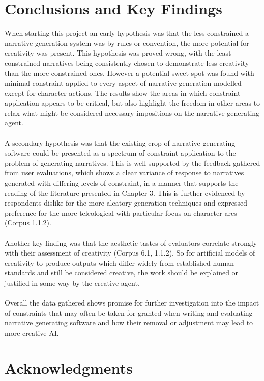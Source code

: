 \documentclass[letterpaper]{article}
\begin{document}
\section{Conclusions and Key Findings}
When starting this project an early hypothesis was that the less constrained a narrative generation system was by rules or convention, the more potential for creativity was present. This hypothesis was proved wrong, with the least constrained narratives being consistently chosen to demonstrate less creativity than the more constrained ones. However a potential sweet spot was found with minimal constraint applied to every aspect of narrative generation modelled except for character actions. The results show the areas in which constraint application appears to be critical, but also highlight the freedom in other areas to relax what might be considered necessary impositions on the narrative generating agent.\\
\\A secondary hypothesis was that the existing crop of narrative generating software could be presented as a spectrum of constraint application to the problem of generating narratives. This is well supported by the feedback gathered from user evaluations, which shows a clear variance of response to narratives generated with differing levels of constraint, in a manner that supports the reading of the literature presented in Chapter 3. This is further evidenced by respondents dislike for the more aleatory generation techniques and expressed preference for the more teleological with particular focus on character arcs (Corpus 1.1.2).\\
\\Another key finding was that the aesthetic tastes of evaluators correlate strongly with their assessment of creativity (Corpus 6.1, 1.1.2). So for artificial models of creativity to produce outputs which differ widely from established human standards and still be considered creative, the work should be explained or justified in some way by the creative agent.\\
\\Overall the data gathered shows promise for further investigation into the impact of constraints that may often be taken for granted when writing and evaluating narrative generating software and how their removal or adjustment may lead to more creative AI. 

\section{Acknowledgments}
\end{document}
